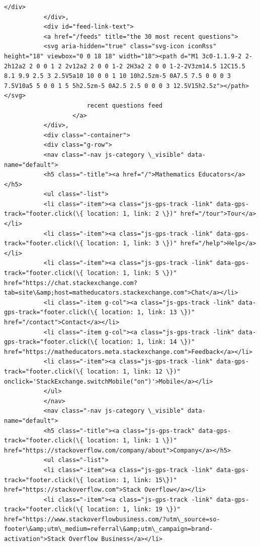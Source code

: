 \documentclass[11pt]{article}
\begin{document}
\begin{Verbatim}[commandchars=\\\{\}]
           </div>
           </div>,
           <div id="feed-link-text">
           <a href="/feeds" title="the 30 most recent questions">
           <svg aria-hidden="true" class="svg-icon iconRss" height="18" viewbox="0 0 18 18" width="18"><path d="M1 3c0-1.1.9-2 2-2h12a2 2 0 0 1 2 2v12a2 2 0 0 1-2 2H3a2 2 0 0 1-2-2V3zm14.5 12C15.5 8.1 9.9 2.5 3 2.5V5a10 10 0 0 1 10 10h2.5zm-5 0A7.5 7.5 0 0 0 3 7.5V10a5 5 0 0 1 5 5h2.5zm-5 0A2.5 2.5 0 0 0 3 12.5V15h2.5z"></path></svg>
                       recent questions feed
                   </a>
           </div>,
           <div class="-container">
           <div class="g-row">
           <nav class="-nav js-category \_visible" data-name="default">
           <h5 class="-title"><a href="/">Mathematics Educators</a></h5>
           <ul class="-list">
           <li class="-item"><a class="js-gps-track -link" data-gps-track="footer.click(\{ location: 1, link: 2 \})" href="/tour">Tour</a></li>
           <li class="-item"><a class="js-gps-track -link" data-gps-track="footer.click(\{ location: 1, link: 3 \})" href="/help">Help</a></li>
           <li class="-item"><a class="js-gps-track -link" data-gps-track="footer.click(\{ location: 1, link: 5 \})" href="https://chat.stackexchange.com?tab=site\&amp;host=matheducators.stackexchange.com">Chat</a></li>
           <li class="-item g-col"><a class="js-gps-track -link" data-gps-track="footer.click(\{ location: 1, link: 13 \})" href="/contact">Contact</a></li>
           <li class="-item g-col"><a class="js-gps-track -link" data-gps-track="footer.click(\{ location: 1, link: 14 \})" href="https://matheducators.meta.stackexchange.com">Feedback</a></li>
           <li class="-item"><a class="js-gps-track -link" data-gps-track="footer.click(\{ location: 1, link: 12 \})" onclick='StackExchange.switchMobile("on")'>Mobile</a></li>
           </ul>
           </nav>
           <nav class="-nav js-category \_visible" data-name="default">
           <h5 class="-title"><a class="js-gps-track" data-gps-track="footer.click(\{ location: 1, link: 1 \})" href="https://stackoverflow.com/company/about">Company</a></h5>
           <ul class="-list">
           <li class="-item"><a class="js-gps-track -link" data-gps-track="footer.click(\{ location: 1, link: 15\})" href="https://stackoverflow.com">Stack Overflow</a></li>
           <li class="-item"><a class="js-gps-track -link" data-gps-track="footer.click(\{ location: 1, link: 19 \})" href="https://www.stackoverflowbusiness.com/?utm\_source=so-footer\&amp;utm\_medium=referral\&amp;utm\_campaign=brand-activation">Stack Overflow Business</a></li>

\end{Verbatim}
\end{document}
